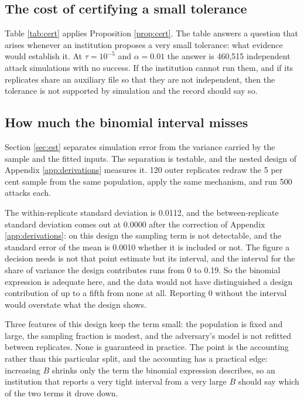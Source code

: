 \documentclass[11pt,a4paper]{article}
\theoremstyle{plain}
\theoremstyle{definition}
\theoremstyle{definition}
\theoremstyle{plain}
\begin{document}
\subsection{The cost of certifying a small tolerance}

Table \ref{tab:cert} applies Proposition \ref{prop:cert}. The table answers a
question that arises whenever an institution proposes a very small tolerance:
what evidence would establish it. At $\tau = 10^{-5}$ and $\alpha = 0.01$ the
answer is 460,515 independent attack simulations with no success. If the
institution cannot run them, and if its replicates share an auxiliary file so
that they are not independent, then the tolerance is not supported by
simulation and the record should say so.



\subsection{How much the binomial interval misses}\label{sec:nested}

Section \ref{sec:est} separates simulation error from the variance carried by the
sample and the fitted inputs. The separation is testable, and the nested design of
Appendix \ref{app:derivations} measures it. 120 outer replicates redraw the 5 per cent sample from the same population, apply
the same mechanism, and run 500 attacks each.

The within-replicate standard deviation is 0.0112, and the between-replicate
standard deviation comes out at 0.0000 after the correction of Appendix
\ref{app:derivations}: on this design the sampling term is not detectable, and the
standard error of the mean is 0.0010 whether it is included or not. The
figure a decision needs is not that point estimate but its interval, and the
interval for the share of variance the design contributes runs from 0 to 0.19. So
the binomial expression is adequate here, and the data would not have
distinguished a design contribution of up to a fifth from none at all. Reporting
0 without the interval would overstate what the design shows.

Three features of this design keep the term small: the population is fixed and
large, the sampling fraction is modest, and the adversary's model is not refitted
between replicates. None is guaranteed in practice. The point is the accounting
rather than this particular split, and the accounting has a practical edge:
increasing $B$ shrinks only the term the binomial expression describes, so an
institution that reports a very tight interval from a very large $B$ should say
which of the two terms it drove down.
\end{document}
